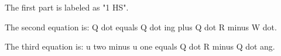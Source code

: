 The first part is labeled as "1 HS".

The second equation is:
Q dot equals Q dot ing plus Q dot R minus W dot.

The third equation is:
u two minus u one equals Q dot R minus Q dot ang.